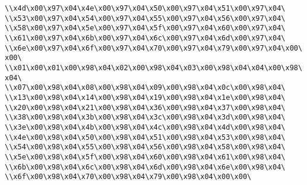 \verb|\\x4d\x00\x97\x04\x4e\x00\x97\x04\x50\x00\x97\x04\x51\x00\x97\x04\|\newline
\verb|\\x53\x00\x97\x04\x54\x00\x97\x04\x55\x00\x97\x04\x56\x00\x97\x04\|\newline
\verb|\\x58\x00\x97\x04\x5e\x00\x97\x04\x5f\x00\x97\x04\x60\x00\x97\x04\|\newline
\verb|\\x61\x00\x97\x04\x6b\x00\x97\x04\x6c\x00\x97\x04\x6d\x00\x97\x04\|\newline
\verb|\\x6e\x00\x97\x04\x6f\x00\x97\x04\x70\x00\x97\x04\x79\x00\x97\x04\x00\x00\|\newline
\verb|\\x01\x00\x01\x00\x98\x04\x02\x00\x98\x04\x03\x00\x98\x04\x04\x00\x98\x04\|\newline
\verb|\\x07\x00\x98\x04\x08\x00\x98\x04\x09\x00\x98\x04\x0c\x00\x98\x04\|\newline
\verb|\\x13\x00\x98\x04\x14\x00\x98\x04\x19\x00\x98\x04\x1e\x00\x98\x04\|\newline
\verb|\\x20\x00\x98\x04\x21\x00\x98\x04\x36\x00\x98\x04\x37\x00\x98\x04\|\newline
\verb|\\x38\x00\x98\x04\x3b\x00\x98\x04\x3c\x00\x98\x04\x3d\x00\x98\x04\|\newline
\verb|\\x3e\x00\x98\x04\x4b\x00\x98\x04\x4c\x00\x98\x04\x4d\x00\x98\x04\|\newline
\verb|\\x4e\x00\x98\x04\x50\x00\x98\x04\x51\x00\x98\x04\x53\x00\x98\x04\|\newline
\verb|\\x54\x00\x98\x04\x55\x00\x98\x04\x56\x00\x98\x04\x58\x00\x98\x04\|\newline
\verb|\\x5e\x00\x98\x04\x5f\x00\x98\x04\x60\x00\x98\x04\x61\x00\x98\x04\|\newline
\verb|\\x6b\x00\x98\x04\x6c\x00\x98\x04\x6d\x00\x98\x04\x6e\x00\x98\x04\|\newline
\verb|\\x6f\x00\x98\x04\x70\x00\x98\x04\x79\x00\x98\x04\x00\x00\|\newline

